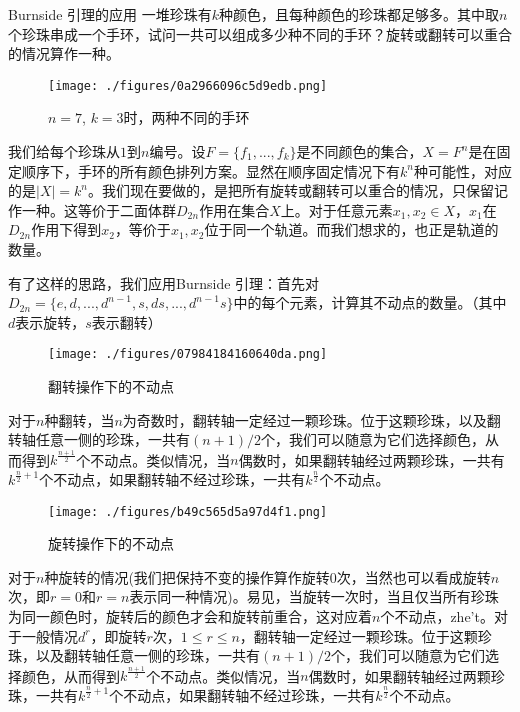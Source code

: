 \begin{example}{Burnside 引理的应用}
一堆珍珠有$k$种颜色，且每种颜色的珍珠都足够多。其中取$n$个珍珠串成一个手环，试问一共可以组成多少种不同的手环？旋转或翻转可以重合的情况算作一种。

\begin{figure}[ht]
\centering
\texttt{[image: ./figures/0a2966096c5d9edb.png]}
\caption{$n=7$, $k=3$时，两种不同的手环} \label{fig_GroupP_1}
\end{figure}

我们给每个珍珠从$1$到$n$编号。设$F=\{f_1,...,f_k\}$是不同颜色的集合，$X=F^n$是在固定顺序下，手环的所有颜色排列方案。显然在顺序固定情况下有$k^n$种可能性，对应的是$|X|=k^n$。我们现在要做的，是把所有旋转或翻转可以重合的情况，只保留记作一种。这等价于二面体群$D_{2n}$作用在集合$X$上。对于任意元素$x_1,x_2\in X$，$x_1$在$D_{2n}$作用下得到$x_2$，等价于$x_1,x_2$位于同一个轨道。而我们想求的，也正是轨道的数量。

有了这样的思路，我们应用Burnside 引理：首先对$D_{2n}=\{e,d,...,d^{n-1},s,ds,...,d^{n-1}s\}$中的每个元素，计算其不动点的数量。（其中$d$表示旋转，$s$表示翻转）

\begin{figure}[ht]
\centering
\texttt{[image: ./figures/07984184160640da.png]}
\caption{翻转操作下的不动点} \label{fig_GroupP_2}
\end{figure}

对于$n$种翻转，当$n$为奇数时，翻转轴一定经过一颗珍珠。位于这颗珍珠，以及翻转轴任意一侧的珍珠，一共有$(n+1)/2$个，我们可以随意为它们选择颜色，从而得到$k^\frac{n+1}{2}$个不动点。类似情况，当$n$偶数时，如果翻转轴经过两颗珍珠，一共有$k^{\frac{n}{2}+1}$个不动点，如果翻转轴不经过珍珠，一共有$k^{\frac{n}{2}}$个不动点。

\begin{figure}[ht]
\centering
\texttt{[image: ./figures/b49c565d5a97d4f1.png]}
\caption{旋转操作下的不动点} \label{fig_GroupP_3}
\end{figure}

对于$n$种旋转的情况(我们把保持不变的操作算作旋转$0$次，当然也可以看成旋转$n$次，即$r=0$和$r=n$表示同一种情况)。易见，当旋转一次时，当且仅当所有珍珠为同一颜色时，旋转后的颜色才会和旋转前重合，这对应着$n$个不动点，zhe't。对于一般情况$d^r$，即旋转$r$次，$1\le r\le n$，翻转轴一定经过一颗珍珠。位于这颗珍珠，以及翻转轴任意一侧的珍珠，一共有$(n+1)/2$个，我们可以随意为它们选择颜色，从而得到$k^\frac{n+1}{2}$个不动点。类似情况，当$n$偶数时，如果翻转轴经过两颗珍珠，一共有$k^{\frac{n}{2}+1}$个不动点，如果翻转轴不经过珍珠，一共有$k^{\frac{n}{2}}$个不动点。
\end{example}




